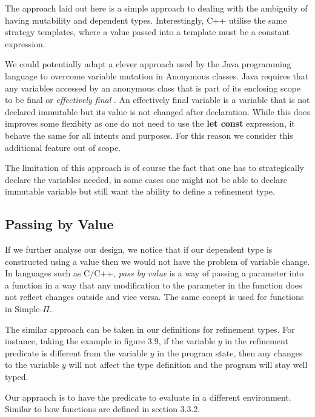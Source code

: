 \documentclass[a4paper,12pt]{report}
\begin{document}
\par
The approach laid out here is a simple approach to dealing with the ambiguity of 
having mutability and dependent types. Interestingly, C++ utilise the same 
strategy templates, where a value passed into a template must be a constant 
expression. 

\par
We could potentially adapt a clever approach used by the Java programming 
language to overcome variable mutation in Anonymous classes. Java requires that 
any variables accessed by an anonymous class that is part of 
its enclosing scope to be final or \textit{effectively final} 
\cite{effectFinal}. An effectively final variable is a variable that is not 
declared immutable but its value is not changed after declaration. While this 
does improves some flexibity as one do not need to use the \textbf{let const} 
expression, it behave the same for all intents and purposes. For this reason we 
consider this additional feature out of scope. 

\par
The limitation of this approach is of course the fact that one has to strategically 
declare the variables needed, in some cases one might not be able to declare 
immutable variable but still want the ability to define a refinement type.

\subsection{Passing by Value}

If we further analyse our design, we notice that if our dependent type is 
constructed using a value then we would not have the problem of variable change. 
In languages such as C/C++, \textit{pass by value} \cite{pbv} is a way of 
passing a parameter into a function in a way that any modification to the 
parameter in the function does not reflect changes outside and vice versa. The 
same cocept is used for functions in Simple-$\Pi$.

\par
The similar approach can be taken in our definitions for refinement types. For 
instance, taking the example in figure 3.9, if the variable $y$ in the refinement  
predicate is different from the variable $y$ in the program state, then any 
changes to the variable $y$ will not affect the type definition and the program 
will stay well typed.

\par
Our appraoch is to have the predicate to evaluate in a different environment. 
Similar to how functions are defined in section 3.3.2. 
\end{document}

